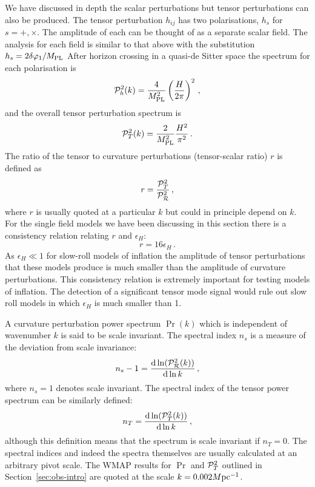 We have discussed in depth the scalar perturbations but tensor perturbations
can also be produced. The tensor perturbation $h_{ij}$
has two polarisations, $h_s$ for $s=+, \times$. The amplitude of
each can be thought of as a separate scalar field. The analysis for each field
is similar to that above with the substitution $h_s= 2\delta\varphi_{1}/M_{\mathrm{PL}}$ After horizon
crossing in a quasi-de Sitter space the spectrum for each polarisation is
% 
\begin{equation}
 \mathcal{P}_h^2(k) = \frac{4}{M_{\mathrm{PL}}^2} \left(\frac{H}{2\pi}\right)^2\,,
\end{equation}
% 
and the overall tensor perturbation spectrum is
% 
\begin{equation}
 \label{eq:Ptdefn-intro}
\mathcal{P}_T^2(k) = \frac{2}{M_{\mathrm{PL}}^2} \frac{H^2}{\pi^2}\,.
\end{equation}
The ratio of the tensor to curvature perturbations (tensor-scalar ratio) $r$ is
defined as 
% 
\begin{equation}
 r = \frac{\mathcal{P}_T^2}{\mathcal{P}_{\mathcal{R}}^2 }\,,
\end{equation}
% 
where $r$ is usually quoted at a particular $k$ but could in principle depend
on $k$. For the single field models we have been discussing in this section
there is a consistency relation relating $r$ and $\epsilon_H$:
% 
\begin{equation}
\label{eq:consistency-intro}
 r = 16 \epsilon_H\,.
\end{equation}
As $\epsilon_H\ll1$ for slow-roll models of inflation the amplitude of tensor
perturbations that these models produce is much smaller than the amplitude of
curvature perturbations. This consistency relation is extremely important for
testing models of inflation. The detection of a significant tensor mode signal
would rule out slow roll models in which $\epsilon_H$ is much smaller than 1.



A curvature perturbation power spectrum $\Pr(k)$ which is independent of
wavenumber $k$ is said to be scale invariant. The spectral index $n_s$ is a
measure of the deviation from scale invariance:
% 
\begin{equation}
\label{eq:nsdefn-intro}
 n_s -1 = \frac{\mathrm{d} \ln (\mathcal{P}_{\mathcal{R}}^2 (k))}{\mathrm{d} \ln k}\,,
\end{equation}
% 
where $n_s=1$ denotes scale invariant. The spectral index of
the tensor power spectrum can be similarly defined:
% 
\begin{equation}
\label{eq:ntdefn-intro}
 n_T = \frac{\mathrm{d} \ln(\mathcal{P}_T^2(k))}{\mathrm{d} \ln k}\,,
\end{equation}
although this definition means that the spectrum is scale invariant if
$n_T=0$.
The spectral indices and indeed the spectra themselves are usually calculated
at an arbitrary pivot scale. The WMAP results for $\Pr$ and $\mathcal{P}_T^2$ outlined in
Section~\ref{sec:obs-intro} are quoted at the scale $k=0.002M \mathrm{pc}^{-1}$.



